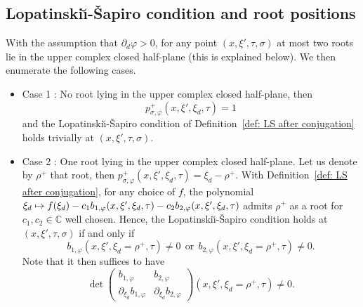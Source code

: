 \documentclass[JEP,XML,SOM,Unicode,published]{cedram}
\newcommand\mto{\mathchoice{\longmapsto}{\mapsto}{\mapsto}{\mapsto}}
\theoremstyle{plain}
\theoremstyle{definition}
\def\C{\mathbb{C}}
\newcommand{\LS}{Lopatinski\u{\i}-\v{S}apiro\xspace}
\newcommand{\pconj}{p_{\sigma,\varphi}}
\begin{document}
\subsection{Lopatinski\u{\i}-\v{S}apiro condition
and root positions}
\label{sec: discussion LS root positions}
With the assumption that $\partial_d\varphi>0$, for any point
$(x,\xi',\tau,\sigma)$ at most two roots lie in the upper complex closed half-plane (this is explained below). We then enumerate the following cases.
\begin{itemize}
\item
Case 1 : No root lying in the upper complex closed
half-plane, then
\[
\pconj^+ (x,\xi',\xi_d,\tau)=1
\]
and the
\LS condition of Definition~\ref{def: LS after conjugation} holds trivially at $(x,\xi',\tau,\sigma)$.

\item
Case 2 : One root lying in the upper complex closed
half-plane. Let us denote by $\rho^+$ that root, then
$\pconj^+ (x,\xi',\xi_d,\tau)=\xi_d-\rho^+$. With
Definition~\ref{def: LS after conjugation}, for any choice of $f$, the polynomial
$\xi_d\mto
f(\xi_d)-c_1b_{1,\varphi}(x,\xi',\xi_d,\tau)-c_2b_{2,\varphi}(x,\xi',\xi_d,\tau)$
admits $\rho^+$ as a root for $c_1,c_2\in\C$ well
chosen. Hence, the \LS condition holds at
$(x,\xi',\tau,\sigma)$ if and only\vspace*{-3pt}
if
\begin{equation*}
b_{1,\varphi}(x,\xi',\xi_d=\rho^+,\tau) \neq 0
\ \ \text{or} \ \
b_{2,\varphi}(x,\xi',\xi_d=\rho^+,\tau)\neq 0.
\end{equation*}
Note that it then suffices to have\vspace*{-3pt}
\begin{equation*}
\det
\begin{pmatrix}
b_{1,\varphi} &b_{2,\varphi}\\[
2pt]
\partial_{\xi_d}b_{1,\varphi}& \partial_{\xi_d}b_{2,\varphi}
\end{pmatrix}(x,\xi',\xi_d=\rho^+,\tau) \neq 0.
\end{equation*}


\end{itemize}
\end{document}

